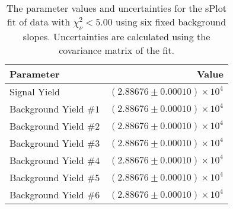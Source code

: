 
\begin{table}[h]
    \begin{center}
        \begin{tabular}{lr}\toprule
            Parameter & Value \\\midrule
            Signal Yield & $(2.88676 \pm 0.00010) \times 10^{4}$ \\
            Background Yield $\#1$ & $(2.88676 \pm 0.00010) \times 10^{4}$ \\
            Background Yield $\#2$ & $(2.88676 \pm 0.00010) \times 10^{4}$ \\
            Background Yield $\#3$ & $(2.88676 \pm 0.00010) \times 10^{4}$ \\
            Background Yield $\#4$ & $(2.88676 \pm 0.00010) \times 10^{4}$ \\
            Background Yield $\#5$ & $(2.88676 \pm 0.00010) \times 10^{4}$ \\
            Background Yield $\#6$ & $(2.88676 \pm 0.00010) \times 10^{4}$ \\\bottomrule
        \end{tabular}
        \caption{The parameter values and uncertainties for the sPlot fit of data with $\chi^2_\nu < 5.00$ using six fixed background slopes. Uncertainties are calculated using the covariance matrix of the fit.}
    \end{center}
\end{table}

